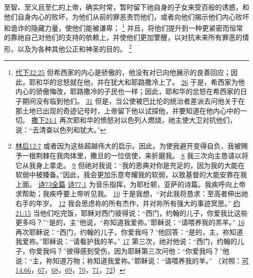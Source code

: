 \documentclass[12pt, a4paper, oneside]{ctexart}
\newcounter{parnum}[section]
\newcommand{\N}{%
   \noindent\refstepcounter{parnum}%
    \makebox[\parindent][l]{\textbf{\arabic{parnum}.}}}
\begin{document}
\N 至智、至义且至仁的上帝，确实时常，暂时留下祂自身的子女来受百般的诱惑，和他们自身内心的败坏，为他们从前的罪恶责罚他们，或者向他们揭示他们内心败坏和诡诈的隐藏力量，使他们能被谦卑；
	\footnote {
		\href{https://biblehub.com/2_chronicles/32-25.htm}{代下32:25} 但希西家的内心是骄傲的，他没有对已向他展示的良善回应；因此，耶和华的忿怒就在他，并在犹大和耶路撒冷上了。
		\href{https://biblehub.com/2_chronicles/32-26.htm}{26} 于是，希西家为他内心的骄傲悔改，耶路撒冷的子民也一样；因此，耶和华的忿怒在希西家的日子期间没有临到他们。
		\href{https://biblehub.com/2_chronicles/32-31.htm}{31} 但是，当公使被巴比伦的统治者差派去问他关于在那土地已出现的奇迹记号时，上帝留下他以试探他，并要知道在他内心中的一切。
		\href{https://biblehub.com/2_samuel/24-1.htm}{撒下24:1} 再次耶和华的愤怒对以色列人燃烧，祂主使大卫对抗他们，说：“去清查以色列和犹大。”
	}
	并且，将他们提升到一种更紧密而恒常的靠祂自己对他们的支持的依赖上，并使他们更加警醒，以对抗未来所有罪恶的情形，以及为各种其他公正和神圣的目的。
	\footnote {
		\href{https://biblehub.com/2_corinthians/12-7.htm}{林后12:7} 或者因为这些超越伟大的启示。因此，为使我避开变得自负，我被赐予一根荆棘在我肉体里，撒旦的一位信使，来折磨我。
		\href{https://biblehub.com/2_corinthians/12-8.htm}{8} 我三次向主恳请以将它从我身上拿走。
		\href{https://biblehub.com/2_corinthians/12-9.htm}{9} 但祂对我说：“我的恩典对你是充足的，因为我的大能在软弱中被臻备。”因此，我会更加乐意夸耀我的软弱，以致基督的大能安靠在我上面。
		\href{https://biblehub.com/niv/psalms/73.htm}{诗73全篇}
		\href{https://biblehub.com/psalms/77-1.htm}{诗77:1} 为音乐指挥，为耶杜顿，亚萨的诗篇。我疾呼向上帝求帮助；我疾呼要上帝听见我。
		\href{https://biblehub.com/psalms/77-10.htm}{10} 于是我想，“对此我将恳求：至高者伸出祂右手的年岁。
		\href{https://biblehub.com/psalms/77-12.htm}{12} 我会思虑祢的所有杰作，并对祢所有强大的事迹冥思。”
		\href{https://biblehub.com/john/21-15.htm}{约21:15} 当他们吃完饭，耶稣对西门彼得说：“西门，约翰的儿子，你爱我比这些更多吗？”“是的，主”他说，“祢知道我爱祢。”耶稣说：“请喂养我的羔羊。”
		\href{https://biblehub.com/john/21-16.htm}{16} 再次耶稣说：“西门，约翰的儿子，你爱我吗？”他回答：“是的，主，祢知道我爱祢。”耶稣说：“请看护我的羊。”
		\href{https://biblehub.com/john/21-17.htm}{17} 第三次，祂对他说：“西门，约翰的儿子，你爱我吗？”彼得感到受伤，因为耶稣第三次问他：“你爱我吗？”他说：“主，祢知道万物；祢知道我爱祢。”耶稣说：“请喂养我的羊。”
		 （对照：\href{https://biblehub.com/mark/14-66.htm}{可14:66}，\href{https://biblehub.com/mark/14-67.htm}{67}，\href{https://biblehub.com/mark/14-68.htm}{68}，\href{https://biblehub.com/mark/14-69.htm}{69}，\href{https://biblehub.com/mark/14-70.htm}{70}，\href{https://biblehub.com/mark/14-71.htm}{71}，\href{https://biblehub.com/mark/14-72.htm}{72}）
	}
\end{document}
